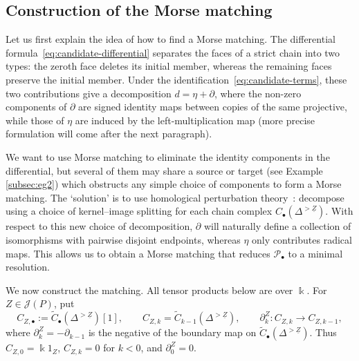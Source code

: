 \documentclass[a4paper,leqno]{amsart}
\begin{document}
\subsection{Construction of the Morse matching}
\label{subsec:construction-morse-matching}

Let us first explain the idea of how to find a Morse matching. The differential formula~\eqref{eq:candidate-differential} separates the faces of a strict chain into two types: the zeroth face deletes its initial member, whereas the remaining faces preserve the initial member.  Under the identification~\eqref{eq:candidate-terms}, these two contributions give a decomposition $d=\eta+\partial$, where the non-zero components of $\partial$ are signed identity maps between copies of the same projective, while those of $\eta$ are induced by the left-multiplication map (more precise formulation will come after the next paragraph).

We want to use Morse matching to eliminate the identity components in the differential, but several of them may share a source or target (see Example \ref{subsec:eg2}) which obstructs any simple choice of components to form a Morse matching. 
The `solution' is to use homological perturbation theory~\cite{GL89}: decompose using a choice of kernel--image splitting for each chain complex $C_\bullet(\Delta^{>\underline{Z}})$. 
With respect to this new choice of decomposition, $\partial$ will naturally define a collection of isomorphisms with pairwise disjoint endpoints, whereas $\eta$ only contributes radical maps.  This allows us to obtain a Morse matching that reduces $\mathcal{P}_\bullet$ to a minimal resolution.

\medskip

We now construct the matching. All tensor products below are over $\Bbbk$. For $Z\in\mathcal J(P)$, put
\[
 C_{Z,\bullet}:=\widetilde C_\bullet(\Delta^{>\underline{Z}})[1],
 \qquad C_{Z,k}=\widetilde C_{k-1}(\Delta^{>\underline{Z}}),
 \qquad \partial^Z_k:C_{Z,k}\longrightarrow C_{Z,k-1},
\]
where $\partial^Z_k = -\partial_{k-1}$ is the negative of the boundary map on $\widetilde{C}_\bullet(\Delta^{>\underline{Z}})$. Thus $C_{Z,0}=\Bbbk 1_Z$, $C_{Z,k}=0$ for $k<0$, and $\partial^Z_0=0$.
\end{document}
